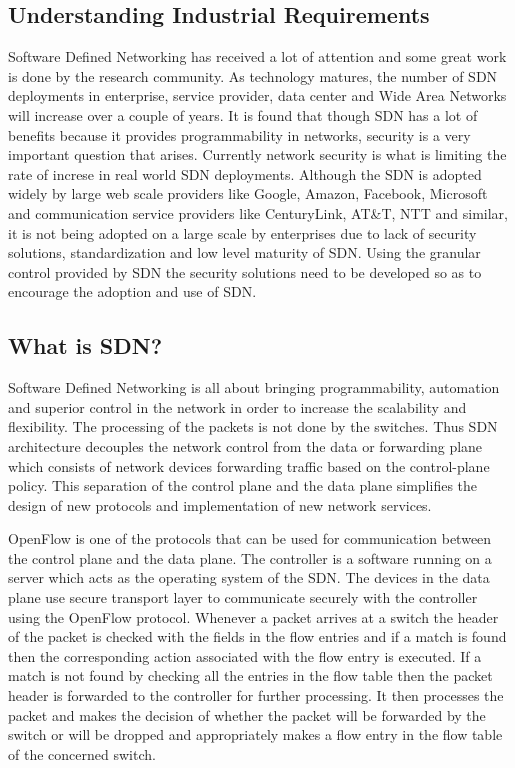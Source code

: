 \documentclass[12pt,a4paper,final]{report}
\begin{document}
\subsection{Understanding Industrial Requirements}
Software Defined Networking has received a lot of attention and some great work is done by the research community. As technology matures, the number of SDN deployments in enterprise, service provider, data center and Wide Area Networks will increase over a couple of years. It is found that though SDN has a lot of benefits because it provides programmability in networks, security is a very important question that arises. Currently network security is what is limiting the rate of increse in real world SDN deployments. Although the SDN is adopted widely by large web scale providers like Google, Amazon, Facebook, Microsoft and communication service providers like CenturyLink, AT\&T, NTT and similar, it is not being adopted on a large scale by enterprises due to lack of security solutions, standardization and low level maturity of SDN. Using the granular control provided by SDN the security solutions need to be developed so as to encourage the adoption and use of SDN.

\subsection{What is SDN?}
Software Defined Networking is all about bringing programmability, automation and superior control in the network in order to increase the scalability and flexibility. The processing of the packets is not done by the switches. Thus SDN architecture decouples the network control from the data or forwarding plane which consists of network devices forwarding traffic based on the control-plane policy. This separation of the control plane and the data plane simplifies the design of new protocols and implementation of new network services.

OpenFlow is one of the protocols that can be used for communication between the control plane and the data plane. The controller is a software running on a server which acts as the operating system of the SDN. The devices in the data plane use secure transport layer to communicate securely with the controller using the OpenFlow protocol. Whenever a packet arrives at a switch the header of the packet is checked with the fields in the flow entries and if a match is found then the corresponding action associated with the flow entry is executed. If a match is not found by checking all the entries in the flow table then the packet header is forwarded to the controller for further processing. It then processes the packet and makes the decision of whether the packet will be forwarded by the switch or will be dropped and appropriately makes a flow entry in the flow table of the concerned switch.
\end{document}
